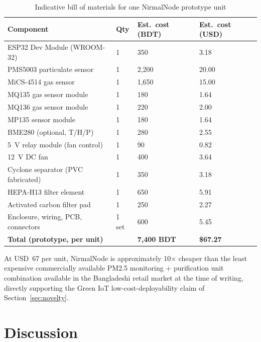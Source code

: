 \begin{table}[htbp]
\centering
\caption{Indicative bill of materials for one NirmalNode prototype unit}
\label{tab:exp-cost}
\begin{tabular}{@{}p{5.5cm}p{2.5cm}p{2.5cm}p{2.5cm}@{}}
\toprule
\textbf{Component} & \textbf{Qty} & \textbf{Est.\ cost (BDT)} & \textbf{Est.\ cost (USD)} \\
\midrule
ESP32 Dev Module (WROOM-32) & 1 & 350 & 3.18 \\
PMS5003 particulate sensor  & 1 & 2,200 & 20.00 \\
MiCS-4514 gas sensor        & 1 & 1,650 & 15.00 \\
MQ135 gas sensor module     & 1 & 180 & 1.64 \\
MQ136 gas sensor module     & 1 & 220 & 2.00 \\
MP135 sensor module         & 1 & 180 & 1.64 \\
BME280 (optional, T/H/P)    & 1 & 280 & 2.55 \\
5~V relay module (fan control) & 1 & 90 & 0.82 \\
12~V DC fan                 & 1 & 400 & 3.64 \\
Cyclone separator (PVC fabricated) & 1 & 350 & 3.18 \\
HEPA-H13 filter element     & 1 & 650 & 5.91 \\
Activated carbon filter pad & 1 & 250 & 2.27 \\
Enclosure, wiring, PCB, connectors & 1 set & 600 & 5.45 \\
\midrule
\textbf{Total (prototype, per unit)} & & \textbf{7,400 BDT} & \textbf{\$67.27} \\
\bottomrule
\end{tabular}
\end{table}

\noindent At USD~67 per unit, NirmalNode is approximately 10$\times$ cheaper than the least expensive commercially available PM2.5 monitoring + purification unit combination available in the Bangladeshi retail market at the time of writing, directly supporting the Green IoT low-cost-deployability claim of Section~\ref{sec:novelty}.

\section{Discussion}
\label{sec:exp-discussion}

